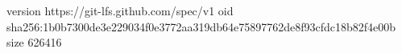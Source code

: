 version https://git-lfs.github.com/spec/v1
oid sha256:1b0b7300de3e229034f0e3772aa319db64e75897762de8f93cfdc18b82f4e00b
size 626416
